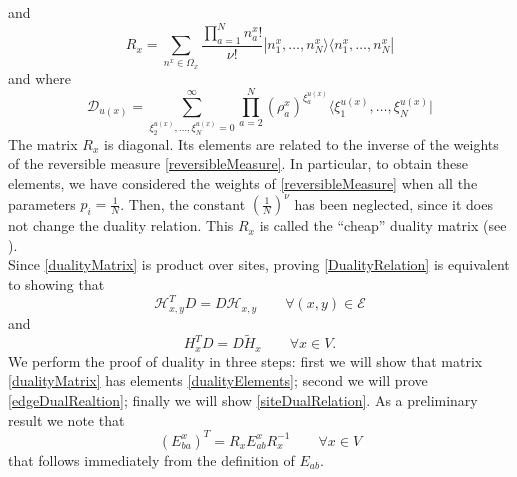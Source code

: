 \documentclass[10pt]{article}
\numberwithin{equation}{section}
\numberwithin{equation}{subsection}
\newcommand{\dd}{\mathcal{D}_{u(x)}}
\begin{document}
and
\begin{equation}\label{Revmatrix}
    R_{x}=\sum_{n^{x}\in\Omega_{x}}\frac{\prod_{a=1}^{N}n_{a}^{x}!}{\nu!}|n_{1}^{x},\ldots,n_{N}^{x}\rangle\langle n_{1}^{x},\ldots,n_{N}^{x}|
\end{equation}
and where 
\begin{equation}\label{dualityMatrix2}
\dd=\sum_{\xi_{2}^{u(x)},\ldots,\xi_{N}^{u(x)}=0}^{\infty}\prod_{a=2}^{N}\left(\rho_{a}^{x}\right)^{\xi_{a}^{u(x)}}\langle \xi_{1}^{u(x)},\ldots,\xi_{N}^{u(x)}|
\end{equation}
The matrix $R_{x}$ is diagonal. Its elements are related to the inverse of the weights of the reversible measure \eqref{reversibleMeasure}. In particular, to obtain these elements, we have considered the weights of \eqref{reversibleMeasure} when all the parameters $p_{i}=\frac{1}{N}$. Then, the constant $\left(\frac{1}{N}\right)^{\nu}$ has been neglected, since it does not change the duality relation. This $R_{x}$ is called the ``cheap'' duality matrix (see \cite{giardina2009duality}). \\
Since \eqref{dualityMatrix} is product over sites, proving \eqref{DualityRelation} is equivalent to showing that 
\begin{equation}\label{edgeDualRealtion}
    \mathcal{H}_{x,y}^{T}D=D\mathcal{H}_{x,y}\qquad \forall (x,y)\in \mathcal{E}
\end{equation}
and 
\begin{equation}\label{siteDualRelation}
    H_{x}^{T}D=D\widetilde{H}_{x}\qquad \forall x\in V.
\end{equation}
We perform the proof of duality in three steps: first we will show that matrix \eqref{dualityMatrix} has elements \eqref{dualityElements}; second we will prove \eqref{edgeDualRealtion}; finally we will show \eqref{siteDualRelation}. 
As a preliminary result we note that 
\begin{equation}\label{transpositionPropertyR}
(E_{ba}^{x})^{T}=R_{x}E_{ab}^{x}R_{x}^{-1}\qquad \forall x\in V
\end{equation}
that follows immediately from the definition of $E_{ab}$. 

\end{document}
